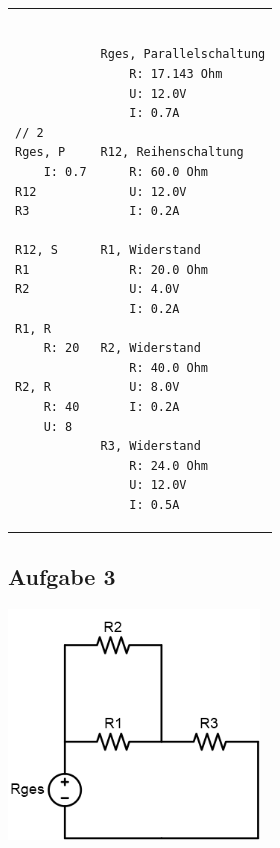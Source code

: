 \documentclass[a4paper,10pt,ngerman]{scrartcl}
\begin{document}
\begin{tabular}{p{}p{}}
\raggedright
\begin{verbatim}

// 2
Rges, P
    I: 0.7
R12
R3

R12, S
R1
R2

R1, R
    R: 20

R2, R
    R: 40
    U: 8

\end{verbatim}   &
\raggedleft
\begin{verbatim}

Rges, Parallelschaltung
    R: 17.143 Ohm
    U: 12.0V
    I: 0.7A

R12, Reihenschaltung
    R: 60.0 Ohm
    U: 12.0V
    I: 0.2A

R1, Widerstand
    R: 20.0 Ohm
    U: 4.0V
    I: 0.2A

R2, Widerstand
    R: 40.0 Ohm
    U: 8.0V
    I: 0.2A

R3, Widerstand
    R: 24.0 Ohm
    U: 12.0V
    I: 0.5A

\end{verbatim}
\end{tabular}

\subsection{Aufgabe 3}

\includegraphics[width=0.5\textwidth]{circuit5.png}
\end{document}
